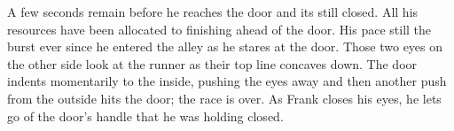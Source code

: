 \begin{Document}
        A few seconds remain before he reaches the door and its still closed. All his resources have been allocated to finishing ahead of the door. His pace still
    the burst ever since he entered the alley as he stares at the door. Those two eyes on the other side look at the runner as their top line concaves down. The
    door indents momentarily to the inside, pushing the eyes away and then another push from the outside hits the door; the race is over. As Frank closes his
    eyes, he lets go of the door's handle that he was holding closed.
\end{Document}
